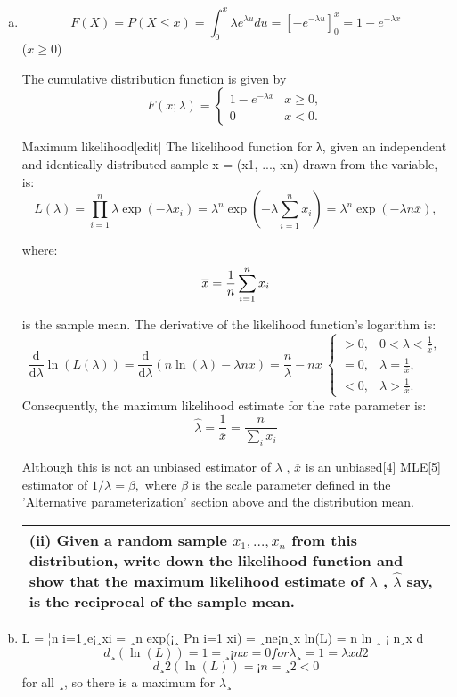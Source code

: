 \documentclass[a4paper,12pt]{article}
\begin{document}
\begin{enumerate}[(a)]
 \item 
 
\[
F(X) = P(X \leq x) = \int^{x}_{0} \lambda e^{\lambda u} du
 = [-e^{-\lambda u}]^{x}_{0}  = 1-e^{-\lambda x}\] ($x \geq  0$)

The cumulative distribution function is given by 
\[ {\displaystyle F(x;\lambda )={\begin{cases}1-e^{-\lambda x}&x\geq 0,\\0&x<0.\end{cases}}} \]


\newpage
Maximum likelihood[edit]
The likelihood function for λ, given an independent and identically distributed sample x = (x1, ..., xn) drawn from the variable, is: 
\[ {\displaystyle L(\lambda )=\prod _{i=1}^{n}\lambda \exp(-\lambda x_{i})=\lambda ^{n}\exp \left(-\lambda \sum _{i=1}^{n}x_{i}\right)=\lambda ^{n}\exp \left(-\lambda n{\overline {x}}\right),} \]

where: 
\[ {\displaystyle {\overline {x}}={1 \over n}\sum _{i=1}^{n}x_{i}} \]

is the sample mean. 
The derivative of the likelihood function's logarithm is: 
\[ {\displaystyle {\frac {\mathrm {d} }{\mathrm {d} \lambda }}\ln(L(\lambda ))={\frac {\mathrm {d} }{\mathrm {d} \lambda }}\left(n\ln(\lambda )-\lambda n{\overline {x}}\right)={\frac {n}{\lambda }}-n{\overline {x}}\ {\begin{cases}>0,&0<\lambda <{\frac {1}{\overline {x}}},\\[8pt]=0,&\lambda ={\frac {1}{\overline {x}}},\\[8pt]<0,&\lambda >{\frac {1}{\overline {x}}}.\end{cases}}} 
\]
Consequently, the maximum likelihood estimate for the rate parameter is: 
\[ {\displaystyle {\widehat {\lambda }}={\frac {1}{\overline {x}}}={\frac {n}{\sum _{i}x_{i}}}} \]

Although this is not an unbiased estimator of 
${\displaystyle \lambda } $
, ${\displaystyle {\overline {x}}}$ 
 is an unbiased[4] MLE[5] estimator of 
${\displaystyle 1/\lambda =\beta ,} $
 where 
${\displaystyle \beta } $
 is the scale parameter defined in the 'Alternative parameterization' section above and the distribution mean. 
  \begin{table}[ht!]
  \centering
  \begin{tabular}{|p{15cm}|}
  \hline 
 (ii) Given a random sample $x_1,\ldots,x_n$ from this distribution, write down the likelihood function and show that the maximum likelihood estimate of $\lambda$ , $\hat{\lambda}$  say, is the reciprocal of the sample mean. 
\\ \hline 
   \end{tabular}
 \end{table}
 \item  L = ¦n i=1¸e¡¸xi = ¸n exp(¡¸
Pn
i=1
xi) = ¸ne¡n¸x ln(L) = n ln ¸ ¡ n¸x
d
\[d¸ (\ln(L)) = 1=¸ ¡ nx = 0 for \lambda¸ = 1=\lambda x d2\]
\[d¸2 (\ln(L)) = ¡n=¸2 < 0 \]for all ¸, 
so there is a maximum for $\lambda$¸


\end{enumerate}
\end{document}
